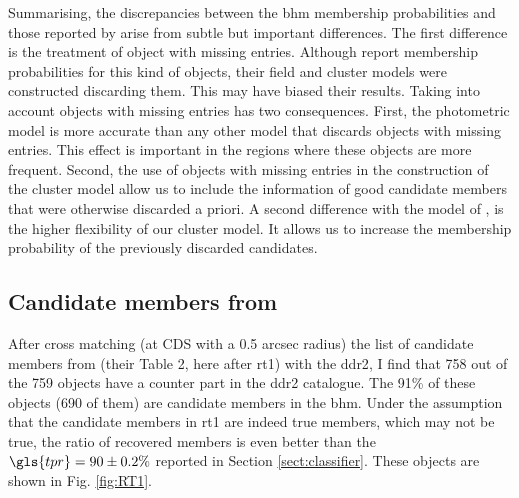 Summarising, the discrepancies between the \gls{bhm} membership probabilities and those reported by \citet{Bouy2015} arise from subtle but important differences. The first difference is the treatment of object with missing entries. Although  \citet{Bouy2015} report membership probabilities for this kind of objects, their field and cluster models were constructed discarding them. This may have biased their results. Taking into account objects with missing entries has two consequences. First, the photometric model is more accurate than any other model that discards objects with missing entries. This effect is important in the regions where these objects are more frequent. Second, the use of objects with missing entries in the construction of the cluster model allow us to include the information of good candidate members that were otherwise discarded a priori. A second difference with the model of \citet{Bouy2015}, is the higher flexibility of our cluster model. It allows us to increase the membership probability of the previously discarded candidates. 

\subsection{Candidate members from \citet{Rebull2016}}
\label{sect:comparisonRebull}

After cross matching (at CDS with a 0.5 arcsec radius) the list of candidate members from \citet{Rebull2016} (their Table 2, here after \gls{rt1}) with the  \gls{ddr2}, I find that 758 out of the 759 objects have a counter part in the \gls{ddr2} catalogue. The 91\% of these objects (690 of them) are candidate members in the \gls{bhm}. Under the assumption that the candidate members in \gls{rt1} are indeed true members, which may not be true, the ratio of recovered members is even better than the $\gls{tpr}=90\pm0.2\%$ reported in Section \ref{sect:classifier}. These objects are shown in Fig. \ref{fig:RT1}.

